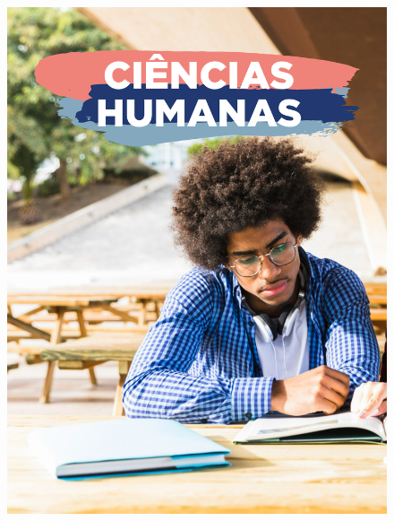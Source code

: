 \begin{figure}[htpb]
\vspace*{-2.5cm}
\hspace*{-2.5cm}\includegraphics[height=\paperheight]{../separadores/separadorCHU9A.png}
\end{figure}
\pagebreak

